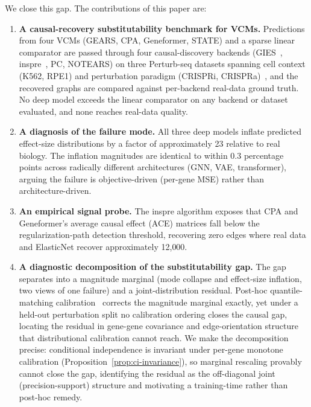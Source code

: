 \documentclass{article}
\theoremstyle{plain}
\theoremstyle{definition}
\theoremstyle{remark}
\begin{document}
We close this gap. The contributions of this paper are:
\begin{enumerate}
\item \textbf{A causal-recovery substitutability benchmark for VCMs.} Predictions from four VCMs (GEARS, CPA, Geneformer, STATE) and a sparse linear comparator are passed through four causal-discovery backends (GIES~\citep{hauser2012gies}, inspre~\citep{brown2025inspre}, PC, NOTEARS) on three Perturb-seq datasets spanning cell context (K562, RPE1) and perturbation paradigm (CRISPRi, CRISPRa)~\citep{replogle2022,norman2019}, and the recovered graphs are compared against per-backend real-data ground truth. No deep model exceeds the linear comparator on any backend or dataset evaluated, and none reaches real-data quality.
\item \textbf{A diagnosis of the failure mode.} All three deep models inflate predicted effect-size distributions by a factor of approximately 23 relative to real biology. The inflation magnitudes are identical to within 0.3 percentage points across radically different architectures (GNN, VAE, transformer), arguing the failure is objective-driven (per-gene MSE) rather than architecture-driven.
\item \textbf{An empirical signal probe.} The inspre algorithm exposes that CPA and Geneformer's average causal effect (ACE) matrices fall below the regularization-path detection threshold, recovering zero edges where real data and ElasticNet recover approximately 12{,}000.
\item \textbf{A diagnostic decomposition of the substitutability gap.} The gap separates into a magnitude marginal (mode collapse and effect-size inflation, two views of one failure) and a joint-distribution residual. Post-hoc quantile-matching calibration~\citep{bolstad2003,reinhard2001} corrects the magnitude marginal exactly, yet under a held-out perturbation split no calibration ordering closes the causal gap, locating the residual in gene-gene covariance and edge-orientation structure that distributional calibration cannot reach. We make the decomposition precise: conditional independence is invariant under per-gene monotone calibration (Proposition~\ref{prop:ci-invariance}), so marginal rescaling provably cannot close the gap, identifying the residual as the off-diagonal joint (precision-support) structure and motivating a training-time rather than post-hoc remedy.
\end{enumerate}

\end{document}
